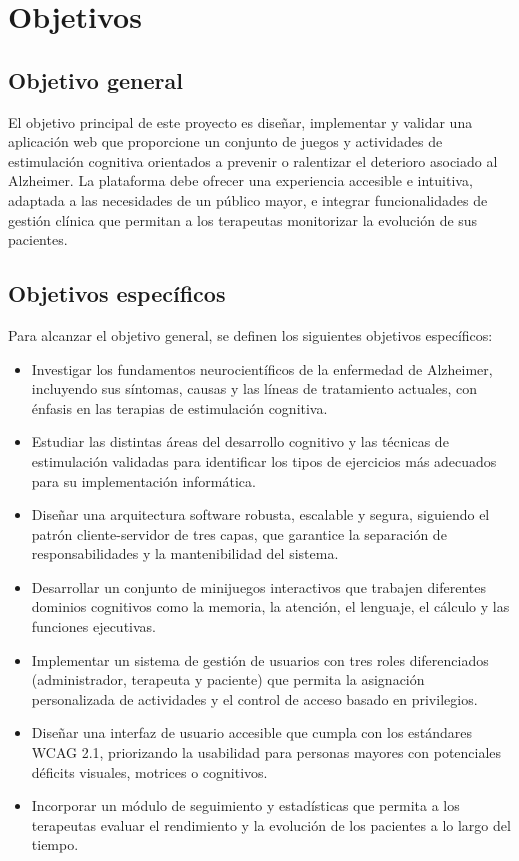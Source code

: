 \section{Objetivos}
\subsection{Objetivo general}
El objetivo principal de este proyecto es diseñar, implementar y validar una aplicación web que proporcione un conjunto de juegos y actividades de estimulación cognitiva orientados a prevenir o ralentizar el deterioro asociado al Alzheimer. La plataforma debe ofrecer una experiencia accesible e intuitiva, adaptada a las necesidades de un público mayor, e integrar funcionalidades de gestión clínica que permitan a los terapeutas monitorizar la evolución de sus pacientes.

\subsection{Objetivos específicos}
Para alcanzar el objetivo general, se definen los siguientes objetivos específicos:
\begin{itemize}
    \item Investigar los fundamentos neurocientíficos de la enfermedad de Alzheimer, incluyendo sus síntomas, causas y las líneas de tratamiento actuales, con énfasis en las terapias de estimulación cognitiva.
    \item Estudiar las distintas áreas del desarrollo cognitivo y las técnicas de estimulación validadas para identificar los tipos de ejercicios más adecuados para su implementación informática.
    \item Diseñar una arquitectura software robusta, escalable y segura, siguiendo el patrón cliente-servidor de tres capas, que garantice la separación de responsabilidades y la mantenibilidad del sistema.
    \item Desarrollar un conjunto de minijuegos interactivos que trabajen diferentes dominios cognitivos como la memoria, la atención, el lenguaje, el cálculo y las funciones ejecutivas.
    \item Implementar un sistema de gestión de usuarios con tres roles diferenciados (administrador, terapeuta y paciente) que permita la asignación personalizada de actividades y el control de acceso basado en privilegios.
    \item Diseñar una interfaz de usuario accesible que cumpla con los estándares WCAG 2.1, priorizando la usabilidad para personas mayores con potenciales déficits visuales, motrices o cognitivos.
    \item Incorporar un módulo de seguimiento y estadísticas que permita a los terapeutas evaluar el rendimiento y la evolución de los pacientes a lo largo del tiempo.
\end{itemize}

